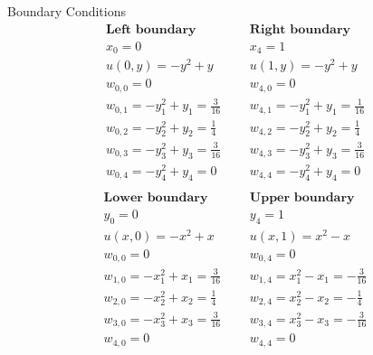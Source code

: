 Boundary Conditions
\[
\begin{array}{lcl}
\textbf{Left boundary}&\ \ \ & \textbf{Right boundary}\\ 
x_0=0&\ \ \ & x_4=1\\ 
u(0,y)=-y^2+y&\ \ \ & u(1,y)=-y^2+y\\

w_{0,0}=0 &\ \ \ & w_{4,0}=0\\ 
w_{0,1}=-y^2_1+y_1 =\frac{3}{16} & \ \ \ & w_{4,1}=-y^2_1+y_1 =\frac{1}{16}\\

w_{0,2}=-y^2_2+y_2 =\frac{1}{4} & \ \ \ & w_{4,2}=-y^2_2+y_2 =\frac{1}{4}\\

w_{0,3}=-y^2_3+y_3 =\frac{3}{16} & \ \ \ & w_{4,3}=-y^2_3+y_3 =\frac{3}{16}\\

w_{0,4}=-y^2_4+y_4 =0 & \ \ \ & w_{4,4}=-y^2_4+y_4 =0\\

\end{array}
\]
\[
\begin{array}{lcl}
\textbf{Lower boundary}&\ \ \ & \textbf{Upper boundary}\\ 
 y_0=0&\ \ \ & y_4=1 \\
 u(x,0)=-x^2+x&\ \ \ & u(x,1)=x^2-x \\

 w_{0,0}=0 & \ \ \ & w_{0,4}=0\\ 

w_{1,0}=-x^2_1+x_1 =\frac{3}{16}  & \ \ \ & w_{1,4}=x^2_1-x_1 =-\frac{3}{16} \\


w_{2,0}=-x^2_2+x_2 =\frac{1}{4}  & \ \ \ & w_{2,4}=x^2_2-x_2 =-\frac{1}{4} \\


w_{3,0}=-x^2_3+x_3 =\frac{3}{16}  & \ \ \ & w_{3,4}=x^2_3-x_3 =-\frac{3}{16} \\


w_{4,0}=0  & \ \ \ & w_{4,4}=0 \\

\end{array}
\]

